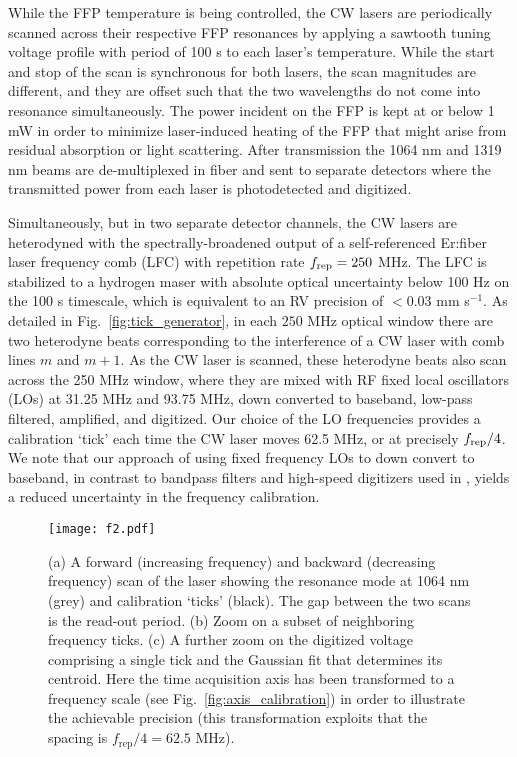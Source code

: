 \documentclass[10pt]{article}
\begin{document}
While the FFP temperature is being controlled, the CW lasers are periodically scanned across their respective FFP resonances by applying a sawtooth tuning voltage profile with period of 100 s to each laser's temperature.  While the start and stop of the scan is synchronous for both lasers, the scan magnitudes are different, and they are offset such that the two wavelengths do not come into resonance simultaneously.  The power incident on the FFP is kept at or below 1 mW in order to minimize laser-induced heating of the FFP that might arise from residual absorption or light scattering.  After transmission the 1064 nm and 1319 nm beams are de-multiplexed in fiber and sent to separate detectors where the transmitted power from each laser is photodetected and digitized. 

Simultaneously, but in two separate detector channels, the CW lasers are heterodyned with the spectrally-broadened output of a self-referenced Er:fiber laser frequency comb (LFC) with repetition rate $f_{\rm rep}=250$ MHz. The LFC is stabilized to a hydrogen maser with absolute optical uncertainty below 100 Hz on the 100 s timescale, which is equivalent to an RV precision of $<0.03$ mm s$^{-1}$. As detailed in Fig.~\ref{fig:tick_generator}, in each $250$ MHz optical window there are two heterodyne beats corresponding to the interference of a CW laser with comb lines $m$ and $m+1$.  As the CW laser is scanned, these heterodyne beats also scan across the 250 MHz window, where they are mixed with RF fixed local oscillators (LOs) at 31.25 MHz and 93.75 MHz, down converted to baseband, low-pass filtered, amplified, and digitized.  Our choice of the LO frequencies provides a calibration \lq{}tick\rq{} each time the CW laser moves 62.5 MHz, or at precisely $f_{\rm rep} / 4$.  We note that our approach of using fixed frequency LOs to down convert to baseband, in contrast to bandpass filters and high-speed digitizers used in \cite{DelHaye:2009}, yields a reduced uncertainty in the frequency calibration.

\begin{figure}
\texttt{[image: f2.pdf]}
\caption{(a) A forward (increasing frequency) and backward (decreasing frequency) scan of the laser showing the resonance mode at 1064 nm (grey) and calibration \lq{}ticks\rq{} (black). The gap between the two scans is the read-out period. (b) Zoom on a subset of neighboring frequency ticks. (c) A further zoom on the digitized voltage comprising a single tick and the Gaussian fit that determines its centroid. Here the time acquisition axis has been transformed to a frequency scale (see Fig.~\ref{fig:axis_calibration}) in order to illustrate the achievable precision (this transformation exploits that the spacing is $f_\mathrm{rep} / 4= 62.5$ MHz).} 
\label{fig:scan_example}
\end{figure}
\end{document}
